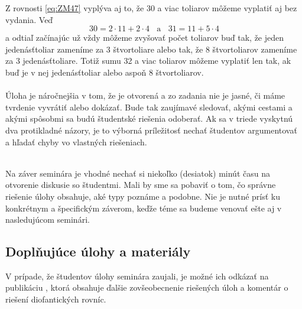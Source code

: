 {{Z rovnosti \ref{eq:ZM47} vyplýva aj to, že 30 a viac toliarov môžeme vyplatiť aj bez vydania. Veď
$$30=2\cdot 11 +2\cdot 4 \ \ \ \ \text{a} \ \ \ \ 31=11+5\cdot 4$$
a odtiaľ začínajúc už vždy môžeme zvyšovať počet toliarov buď tak, že jeden jedenásťtoliar zameníme za 3 štvortoliare alebo tak, že 8 štvortoliarov zameníme za 3 jedenásťtoliare. Totiž sumu 32 a viac toliarov môžeme vyplatiť len tak, ak buď je v nej jedenásťtoliar alebo aspoň 8 štvortoliarov.\\
\\
\kom Úloha je náročnejšia v tom, že je otvorená a zo zadania nie je jasné, či máme tvrdenie vyvrátiť alebo dokázať. Bude tak zaujímavé sledovať, akými cestami a akými spôsobmi sa budú študentské riešenia odoberať. Ak sa v triede vyskytnú dva protikladné názory, je to výborná príležitosť nechať študentov argumentovať a hľadať chyby vo vlastných riešeniach.\\
\\
}

\kom Na záver seminára je vhodné nechať si niekoľko (desiatok) minút času na otvorenie diskusie so študentmi. Mali by sme sa pobaviť o tom, čo správne riešenie úlohy obsahuje, aké typy poznáme a podobne. Nie je nutné prísť ku konkrétnym a špecifickým záverom, keďže téme sa budeme venovať ešte aj v nasledujúcom seminári.

\subsection*{Doplňujúce úlohy a materiály}
V prípade, že študentov úlohy seminára zaujali, je možné ich odkázať na publikáciu \cite{ZM}, ktorá obsahuje ďalšie zovšeobecnenie riešených úloh a komentár o riešení diofantických rovníc.

}
